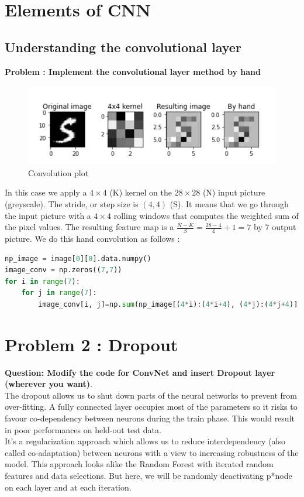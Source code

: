 \section{Elements of CNN}

\subsection{Understanding the convolutional layer}
\textbf{Problem : Implement the convolutional layer method by hand} \\

\begin{figure}[ht]
  \centering
  \includegraphics{Pics/convolutionn}
  \caption{Convolution plot}
\end{figure}
In this case we apply a $4 \times 4$ (K) kernel on the $28 \times 28$ (N) input picture (greyscale). The stride, or step size is $(4,4)$ (S). It means that we go through the input picture with a $4\times 4$ rolling windows that computes the weighted sum of the pixel values. The resulting feature map is a $\frac{N-K}{S}=\frac{28-4}{4}+1=7$ by 7 output picture. We do this hand convolution as follows : 
\begin{lstlisting}[language=Python]
np_image = image[0][0].data.numpy()
image_conv = np.zeros((7,7))
for i in range(7):
    for j in range(7):
        image_conv[i, j]=np.sum(np_image[(4*i):(4*i+4), (4*j):(4*j+4)] * weight)

\end{lstlisting}


\section{Problem 2 : Dropout}

\textbf{Question: Modify the code for ConvNet and insert Dropout layer (wherever you want)}.\\
	The dropout allows us to shut down parts of the neural networks to prevent from over-fitting. A fully connected layer occupies most of the parameters so it risks to favour co-dependency between neurons during the train phase. This would result in poor performances on held-out test data.\\
It's a regularization approach which allows us to reduce interdependency (also called co-adaptation) between neurons with a view to increasing robustness of the model. This approach looks alike the Random Forest with iterated random features and data selections. But here, we will be randomly deactivating p*node on each layer and at each iteration.  \\

